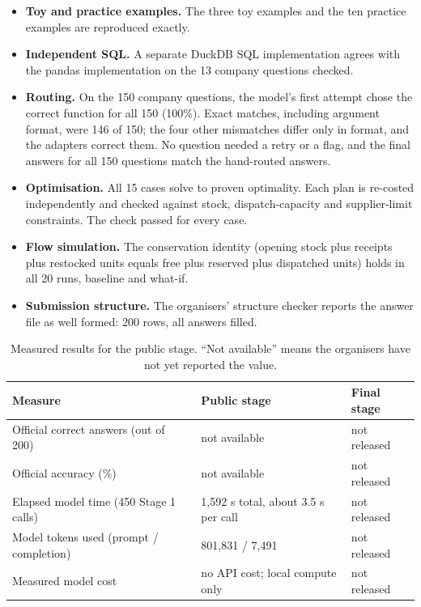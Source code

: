 \documentclass[11pt,a4paper]{article}
\begin{document}
\begin{itemize}
  \item \textbf{Toy and practice examples.} The three toy examples and the ten
    practice examples are reproduced exactly.
  \item \textbf{Independent SQL.} A separate DuckDB SQL implementation agrees with
    the pandas implementation on the 13 company questions checked.
  \item \textbf{Routing.} On the 150 company questions, the model's first attempt chose the correct function for all 150 (100\%). Exact matches, including argument format, were 146 of 150; the four other mismatches differ only in format, and the adapters correct them. No question needed a retry or a flag, and the final answers for all 150 questions match the hand-routed answers.
\item \textbf{Optimisation.} All 15 cases solve to proven optimality. Each plan
    is re-costed independently and checked against stock, dispatch-capacity and
    supplier-limit constraints. The check passed for every case.
  \item \textbf{Flow simulation.} The conservation identity (opening stock plus
    receipts plus restocked units equals free plus reserved plus dispatched units)
    holds in all 20 runs, baseline and what-if.
  \item \textbf{Submission structure.} The organisers' structure checker reports
    the answer file as well formed: 200 rows, all answers filled.
\end{itemize}

\begin{table}[htbp]
\centering
\caption{Measured results for the public stage. ``Not available'' means the
organisers have not yet reported the value.}
\begin{tabularx}{\linewidth}{@{}Xll@{}}
\toprule
Measure & Public stage & Final stage \\
\midrule
Official correct answers (out of 200) & not available & not released \\
Official accuracy (\%) & not available & not released \\
Elapsed model time (450 Stage 1 calls) & 1,592 s total, about 3.5 s per call & not released \\
Model tokens used (prompt / completion) & 801,831 / 7,491 & not released \\
Measured model cost & no API cost; local compute only & not released \\
\bottomrule
\end{tabularx}
\end{table}
\end{document}
